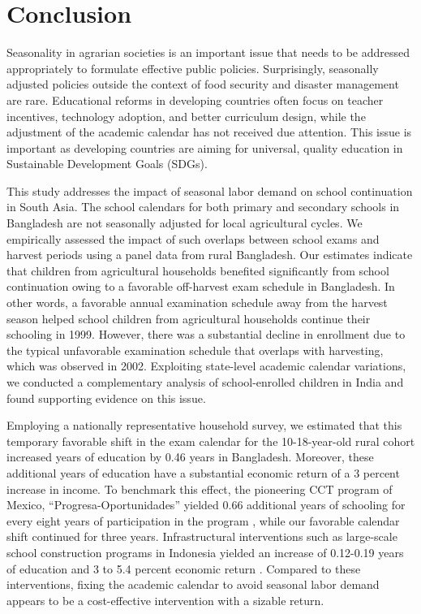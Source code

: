 \documentclass[12pt,letterpaper]{article}\usepackage[margin=1in]{geometry}
\newcommand{\0}{\ensuremath{\mbox{\boldmath $0$}}}
\begin{document}
\section{Conclusion}

Seasonality in agrarian societies is an important issue that needs to be addressed appropriately to formulate effective public policies. Surprisingly, seasonally adjusted policies outside the context of food security and disaster management are rare. Educational reforms in developing countries often focus on teacher incentives, technology adoption, and better curriculum design, while the adjustment of the academic calendar has not received due attention. This issue is important as developing countries are aiming for universal, quality education in Sustainable Development Goals (SDGs).

This study addresses the impact of seasonal labor demand on school continuation in South Asia. The school calendars for both primary and secondary schools in Bangladesh are not seasonally adjusted for local agricultural cycles. We empirically assessed the impact of such overlaps between school exams and harvest periods using a panel data from rural Bangladesh. Our estimates indicate that children from agricultural households benefited significantly from school continuation owing to a favorable off-harvest exam schedule in Bangladesh. In other words, a favorable annual examination schedule away from the harvest season helped school children from agricultural households continue their schooling in 1999. However, there was a substantial decline in enrollment due to the typical unfavorable examination schedule that overlaps with harvesting, which was observed in 2002. Exploiting state-level academic calendar variations, we conducted a complementary analysis of school-enrolled children in India and found supporting evidence on this issue.

Employing a nationally representative household survey, we estimated that this temporary favorable shift in the exam calendar for the 10-18-year-old rural cohort increased years of education by 0.46 years in Bangladesh. Moreover, these additional years of education have a substantial economic return of a 3 percent increase in income. To benchmark this effect, the pioneering CCT program of Mexico, ``Progresa-Oportunidades'' yielded 0.66 additional years of schooling for every eight years of participation in the program \citep{reimers2006education}, while our favorable calendar shift continued for three years. Infrastructural interventions such as large-scale school construction programs in Indonesia yielded an increase of 0.12-0.19 years of education and 3 to 5.4 percent economic return \citep{duflo2001schooling}. Compared to these interventions, fixing the academic calendar to avoid seasonal labor demand appears to be a cost-effective intervention with a sizable return.
\end{document}
